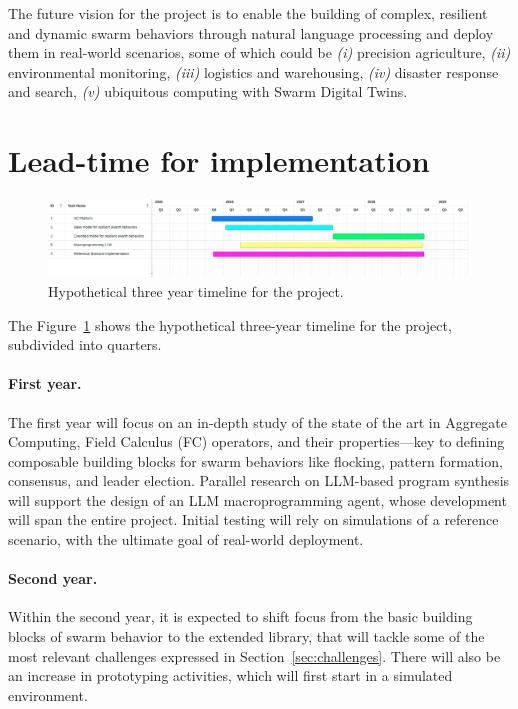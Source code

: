 \documentclass[12pt]{article}
\begin{document}
The future vision for the project is to enable the building of complex, resilient and dynamic swarm behaviors through natural language processing and deploy them in real-world scenarios, some of which could be \textit{(i)} precision agriculture,
\textit{(ii)} environmental monitoring, \textit{(iii)} logistics and warehousing, \textit{(iv)} disaster response and search, 
\textit{(v)} ubiquitous computing with Swarm Digital Twins.

\section{Lead-time for implementation}
\begin{figure}
	\includegraphics[width=\linewidth]{figures/timeline-2.png}
	\caption{Hypothetical three year timeline for the project.}
	\label{fig:timeline}
\end{figure}

The Figure~\ref{fig:timeline} shows the hypothetical three-year timeline for the project, subdivided into quarters.

\paragraph{First year.} The first year will focus on an in-depth study of the state of the art in Aggregate Computing, Field Calculus (FC) operators, and their properties—key to defining composable building blocks for swarm behaviors like flocking, pattern formation, consensus, and leader election. Parallel research on LLM-based program synthesis will support the design of an LLM macroprogramming agent, whose development will span the entire project. Initial testing will rely on simulations of a reference scenario, with the ultimate goal of real-world deployment.
\paragraph{Second year.} Within the second year, it is expected to shift focus from the basic building blocks of swarm behavior to the extended library, that will tackle some of the most relevant challenges expressed in Section~\ref{sec:challenges}.
There will also be an increase in prototyping activities, which will first start in a simulated environment.
\end{document}
